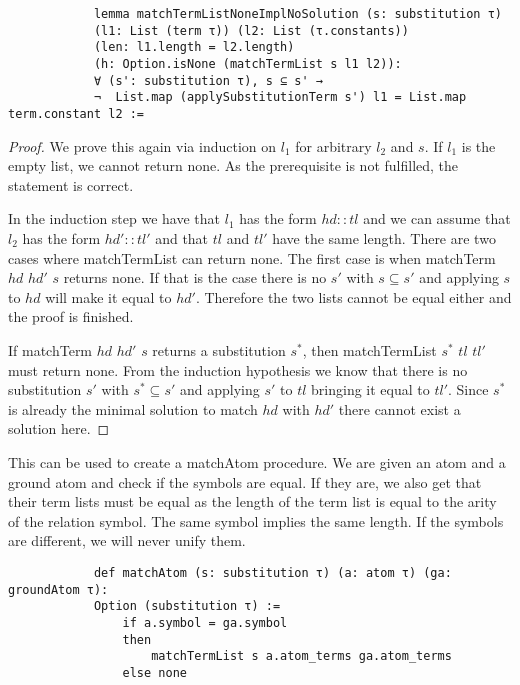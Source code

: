 \documentclass{article}
\begin{document}
        \begin{lstlisting}
            lemma matchTermListNoneImplNoSolution (s: substitution τ)
            (l1: List (term τ)) (l2: List (τ.constants))
            (len: l1.length = l2.length) 
            (h: Option.isNone (matchTermList s l1 l2)): 
            ∀ (s': substitution τ), s ⊆ s' →
            ¬  List.map (applySubstitutionTerm s') l1 = List.map term.constant l2 :=
        \end{lstlisting}
        \begin{proof}
            We prove this again via induction on $l_1$ for arbitrary $l_2$ and $s$. If $l_1$ is the empty list, we cannot return none. As the prerequisite is not fulfilled, the statement is correct.

            In the induction step we have that $l_1$ has the form $hd::tl$ and we can assume that $l_2$ has the form $hd'::tl'$ and that $tl$ and $tl'$ have the same length. There are two cases where matchTermList can return none. The first case is when matchTerm $hd$ $hd'$ $s$ returns none. If that is the case there is no $s'$ with $s\subseteq s'$ and applying $s$ to $hd$ will make it equal to $hd'$. Therefore the two lists cannot be equal either and the proof is finished.

            If matchTerm $hd$ $hd'$ $s$ returns a substitution $s^\ast$, then matchTermList $s^\ast$ $tl$ $tl'$ must return none. From the induction hypothesis we know that there is no substitution $s'$ with $s^\ast \subseteq s'$ and applying $s'$ to $tl$ bringing it equal to $tl'$. Since $s^\ast$ is already the minimal solution to match $hd$ with $hd'$ there cannot exist a solution here.
        \end{proof}

        This can be used to create a matchAtom procedure. We are given an atom and a ground atom and check if the symbols are equal. If they are, we also get that their term lists must be equal as the length of the term list is equal to the arity of the relation symbol. The same symbol implies the same length.
        If the symbols are different, we will never unify them.

        \begin{lstlisting}
            def matchAtom (s: substitution τ) (a: atom τ) (ga: groundAtom τ):
            Option (substitution τ) :=
                if a.symbol = ga.symbol
                then
                    matchTermList s a.atom_terms ga.atom_terms
                else none
        \end{lstlisting}
\end{document}
